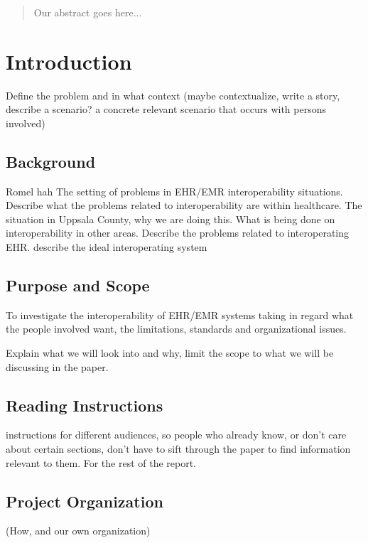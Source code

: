 \documentclass[12pt]{article}
\begin{document}
\nocite{Sh:1}



\tableofcontents
\newpage

\begin{abstract}
Our abstract goes here... 
\end{abstract}

\newpage


\section{Introduction}
Define the problem and in what context (maybe contextualize, write a story, describe a scenario? a concrete relevant scenario that occurs with persons involved)


\subsection{Background}

Romel hah The setting of problems in EHR/EMR interoperability situations. Describe what the problems related to interoperability are within healthcare. The situation in Uppsala County, why we are doing this. What is being done on interoperability in other areas. Describe the problems related to interoperating EHR.
describe the ideal interoperating system

\subsection{Purpose and Scope}
To investigate the interoperability of
EHR/EMR systems taking in regard what
the people involved want, the limitations,
standards and organizational issues.

Explain what we will look into and why, limit the scope to what we will be discussing in the paper.

\subsection{Reading Instructions}
instructions for different audiences, so people who already know, or don't care about certain sections, don't have to sift through the paper to find information relevant to them. For the rest of the report.


\subsection{Project Organization}
 (How, and our own organization)
\end{document}
